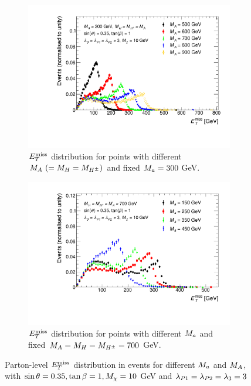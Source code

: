 \begin{figure}%
	\centering

	\begin{subfigure}[t]{0.45\textwidth}
	\centering
	\includegraphics[width=\textwidth]{texinputs/04_grid/figures/monoHbb_m_large_A_scan_MET_liny_norm2one.pdf}
	\caption{$E_T^\mathrm{miss}$ distribution for points with different $M_{A}~(=M_{H}=M_{H^{\pm}})$
    and fixed $M_{a} = 300$ GeV. 
	\label{fig:monoHbb_mA_scan_met}} 
    \end{subfigure}
    \begin{subfigure}[t]{0.45\textwidth}
	\centering
	\includegraphics[width=\textwidth]{texinputs/04_grid/figures/monoHbb_m_small_a_scan_MET_liny_norm2one.pdf}	
	\caption{$E_T^\mathrm{miss}$ distribution for points with different $M_{a}$ and fixed $ M_{A}=M_{H}=M_{H^{\pm}}= 700$ GeV. \label{fig:monoHbb_ma_scan_met}}
    \end{subfigure}
    
    \caption{Parton-level $E_T^\mathrm{miss}$ distribution in \monohbb events for different $M_{a}$ and $M_{A}$, with $ \sin\theta = 0.35, \tan\beta = 1, M_{\chi} = 10$ GeV and $ \lambda_{P1} = \lambda_{P2} = \lambda_{3} = 3 $}
\end{figure}

